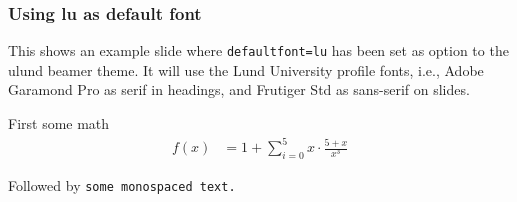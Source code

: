 \documentclass[aspectratio=1610]{beamer}
\begin{document}
\begin{frame}
  \frametitle{Using lu as default font}
  This shows an example slide where \texttt{defaultfont=lu} has been set as option to the ulund beamer theme. It will use the Lund University profile fonts, i.e., Adobe Garamond Pro as serif in headings, and Frutiger Std as sans-serif on slides.

  \medskip
  First some math
  \begin{align}
    f(x) &= 1 + \sum_{i=0}^{5} x \cdot \frac{5+x}{x^3}
  \end{align}

  \medskip
  Followed by \texttt{some monospaced text.}
\end{frame}

\end{document}
